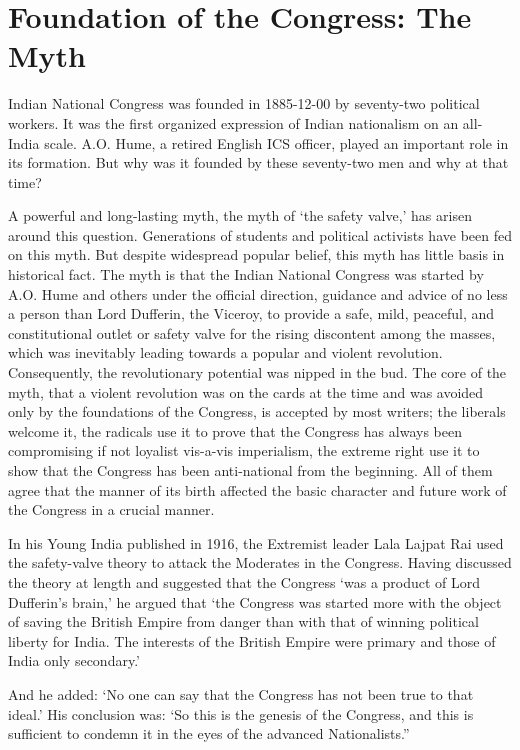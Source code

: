 \chapter{Foundation of the Congress: The Myth}

Indian National Congress was founded in 1885-12-00 by seventy-two political workers. It was the first organized expression of Indian nationalism on an all-India scale. A.O. Hume, a retired English ICS officer, played an important role in its formation. But why was it founded by these seventy-two men and why at that time?

A powerful and long-lasting myth, the myth of ‘the safety valve,’ has arisen around this question. Generations of students and political activists have been fed on this myth. But despite widespread popular belief, this myth has little basis in historical fact. The myth is that the Indian National Congress was started by A.O. Hume and others under the official direction, guidance and advice of no less a person than Lord Dufferin, the Viceroy, to provide a safe, mild, peaceful, and constitutional outlet or safety valve for the rising discontent among the masses, which was inevitably leading towards a popular and violent revolution. Consequently, the revolutionary potential was nipped in the bud. The core of the myth, that a violent revolution was on the cards at the time and was avoided only by the foundations of the Congress, is accepted by most writers; the liberals welcome it, the radicals use it to prove that the Congress has always been compromising if not loyalist vis-a-vis imperialism, the extreme right use it to show that the Congress has been anti-national from the beginning. All of them agree that the manner of its birth affected the basic character and future work of the Congress in a crucial manner.

In his Young India published in 1916, the Extremist leader Lala Lajpat Rai used the safety-valve theory to attack the Moderates in the Congress. Having discussed the theory at length and suggested that the Congress ‘was a product of Lord Dufferin’s brain,’ he argued that ‘the Congress was started more with the object of saving the British Empire from danger than with that of winning political liberty for India. The interests of the British Empire were primary and those of India only secondary.’

And he added: ‘No one can say that the Congress has not been true to that ideal.’ His conclusion was: ‘So this is the genesis of the Congress, and this is sufficient to condemn it in the eyes of the advanced Nationalists.”

